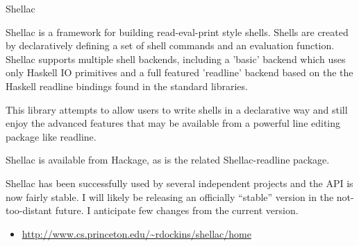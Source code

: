 \documentclass{article}
\begin{document}
\begin{hcarentry}{Shellac}
\makeheader

Shellac is a framework for building read-eval-print style shells.  
Shells are created by declaratively defining a set of shell commands
and an evaluation function.  Shellac supports multiple shell backends,
including a 'basic' backend which uses only Haskell IO primitives and
a full featured 'readline' backend based on the the Haskell readline
bindings found in the standard libraries.

This library attempts to allow users to write shells in a declarative
way and still enjoy the advanced features that may be available from a
powerful line editing package like readline. 

Shellac is available from Hackage, as is the related
Shellac-readline package.

Shellac has been successfully used by several independent projects
and the API is now fairly stable.  I will likely be releasing an
officially ``stable'' version in the not-too-distant future.
I anticipate few changes from the current version.

\FurtherReading
\begin{itemize}
\item \url{http://www.cs.princeton.edu/~rdockins/shellac/home}
\end{itemize}
\end{hcarentry}
\end{document}
